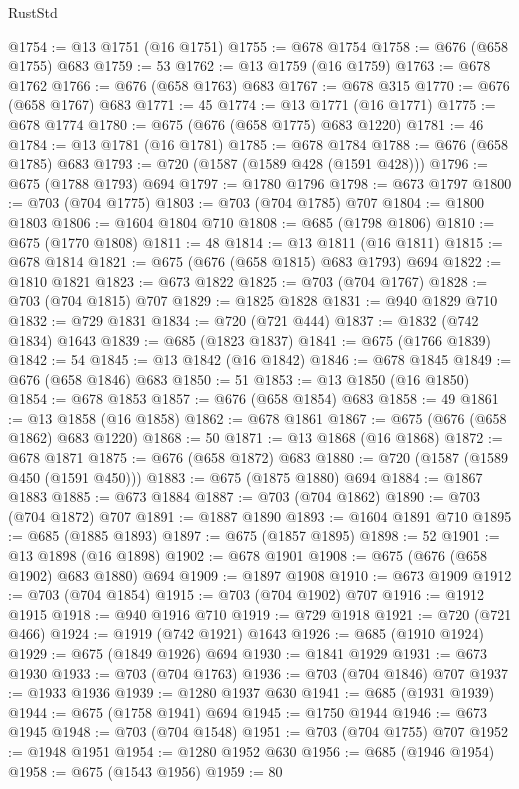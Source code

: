 \begin{lexlean}{RustStd}
\begin{coremodule}
@1754 := @13 @1751 (@16 @1751)
@1755 := @678 @1754
@1758 := @676 (@658 @1755) @683
@1759 := 53
@1762 := @13 @1759 (@16 @1759)
@1763 := @678 @1762
@1766 := @676 (@658 @1763) @683
@1767 := @678 @315
@1770 := @676 (@658 @1767) @683
@1771 := 45
@1774 := @13 @1771 (@16 @1771)
@1775 := @678 @1774
@1780 := @675 (@676 (@658 @1775) @683 @1220)
@1781 := 46
@1784 := @13 @1781 (@16 @1781)
@1785 := @678 @1784
@1788 := @676 (@658 @1785) @683
@1793 := @720 (@1587 (@1589 @428 (@1591 @428)))
@1796 := @675 (@1788 @1793) @694
@1797 := @1780 @1796
@1798 := @673 @1797
@1800 := @703 (@704 @1775)
@1803 := @703 (@704 @1785) @707
@1804 := @1800 @1803
@1806 := @1604 @1804 @710
@1808 := @685 (@1798 @1806)
@1810 := @675 (@1770 @1808)
@1811 := 48
@1814 := @13 @1811 (@16 @1811)
@1815 := @678 @1814
@1821 := @675 (@676 (@658 @1815) @683 @1793) @694
@1822 := @1810 @1821
@1823 := @673 @1822
@1825 := @703 (@704 @1767)
@1828 := @703 (@704 @1815) @707
@1829 := @1825 @1828
@1831 := @940 @1829 @710
@1832 := @729 @1831
@1834 := @720 (@721 @444)
@1837 := @1832 (@742 @1834) @1643
@1839 := @685 (@1823 @1837)
@1841 := @675 (@1766 @1839)
@1842 := 54
@1845 := @13 @1842 (@16 @1842)
@1846 := @678 @1845
@1849 := @676 (@658 @1846) @683
@1850 := 51
@1853 := @13 @1850 (@16 @1850)
@1854 := @678 @1853
@1857 := @676 (@658 @1854) @683
@1858 := 49
@1861 := @13 @1858 (@16 @1858)
@1862 := @678 @1861
@1867 := @675 (@676 (@658 @1862) @683 @1220)
@1868 := 50
@1871 := @13 @1868 (@16 @1868)
@1872 := @678 @1871
@1875 := @676 (@658 @1872) @683
@1880 := @720 (@1587 (@1589 @450 (@1591 @450)))
@1883 := @675 (@1875 @1880) @694
@1884 := @1867 @1883
@1885 := @673 @1884
@1887 := @703 (@704 @1862)
@1890 := @703 (@704 @1872) @707
@1891 := @1887 @1890
@1893 := @1604 @1891 @710
@1895 := @685 (@1885 @1893)
@1897 := @675 (@1857 @1895)
@1898 := 52
@1901 := @13 @1898 (@16 @1898)
@1902 := @678 @1901
@1908 := @675 (@676 (@658 @1902) @683 @1880) @694
@1909 := @1897 @1908
@1910 := @673 @1909
@1912 := @703 (@704 @1854)
@1915 := @703 (@704 @1902) @707
@1916 := @1912 @1915
@1918 := @940 @1916 @710
@1919 := @729 @1918
@1921 := @720 (@721 @466)
@1924 := @1919 (@742 @1921) @1643
@1926 := @685 (@1910 @1924)
@1929 := @675 (@1849 @1926) @694
@1930 := @1841 @1929
@1931 := @673 @1930
@1933 := @703 (@704 @1763)
@1936 := @703 (@704 @1846) @707
@1937 := @1933 @1936
@1939 := @1280 @1937 @630
@1941 := @685 (@1931 @1939)
@1944 := @675 (@1758 @1941) @694
@1945 := @1750 @1944
@1946 := @673 @1945
@1948 := @703 (@704 @1548)
@1951 := @703 (@704 @1755) @707
@1952 := @1948 @1951
@1954 := @1280 @1952 @630
@1956 := @685 (@1946 @1954)
@1958 := @675 (@1543 @1956)
@1959 := 80

\end{coremodule}
\end{lexlean}
